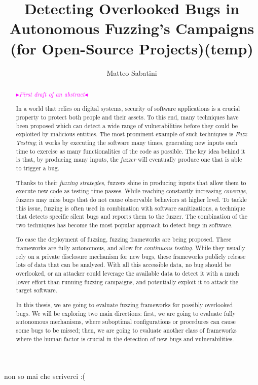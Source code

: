 \documentclass[binding=0.6cm, oneside]{sapthesis}%
\title{Detecting Overlooked Bugs in Autonomous Fuzzing's Campaigns (for Open-Source Projects)(temp)}
\author{Matteo Sabatini}
\newcommand{\mytext}[2]{\textcolor{#1}{#2}}
\newcommand{\mynote}[2]{\xspace\fbox{\bfseries\sffamily\scriptsize{#1}}
	{\small$\blacktriangleright$\textsf{\scriptsize\emph{#2}}$\blacktriangleleft$}}
\newcommand{\matteo}[1]{\mytext{magenta}{\mynote{MM}{#1}}}
\begin{document}
\frontmatter
\maketitle

\begin{acknowledgments}
non so mai che scriverci :(
\end{acknowledgments}


\begin{abstract}

	\matteo{First draft of an abstract}

	In a world that relies on digital systems, security of software applications is a crucial property to protect both people and their assets. To this end, many techniques have been proposed which can detect a wide range of vulnerabilities before they could be exploited by malicious entities. The most prominent example of such techniques is \textit{Fuzz Testing}; it works by executing the software many times, generating new inputs each time to exercise as many functionalities of the code as possible. The key idea behind it is that, by producing many inputs, the \textit{fuzzer} will eventually produce one that is able to trigger a bug.

	Thanks to their \textit{fuzzing strategies}, fuzzers shine in producing inputs that allow them to execute new code as testing time passes. While reaching constantly increasing \textit{coverage}, fuzzers may miss bugs that do not cause observable behaviors at higher level. To tackle this issue, fuzzing is often used in combination with software sanitizations, a technique that detects specific silent bugs and reports them to the fuzzer. The combination of the two techniques has become the most popular approach to detect bugs in software.

	To ease the deployment of fuzzing, fuzzing frameworks are being proposed. These frameworks are fully autonomous, and allow for \textit{continuous testing}. While they usually rely on a private disclosure mechanism for new bugs, these frameworks publicly release lots of data that can be analyzed. With all this accessible data, no bug should be overlooked, or an attacker could leverage the available data to detect it with a much lower effort than running fuzzing campaigns, and potentially exploit it to attack the target software.
	
	In this thesis, we are going to evaluate fuzzing frameworks for possibly overlooked bugs. We will be exploring two main directions: first, we are going to evaluate fully autonomous mechanisms, where suboptimal configurations or procedures can cause some bugs to be missed; then, we are going to evaluate another class of frameworks where the human factor is crucial in the detection of new bugs and vulnerabilities.


\end{abstract}
\end{document}
